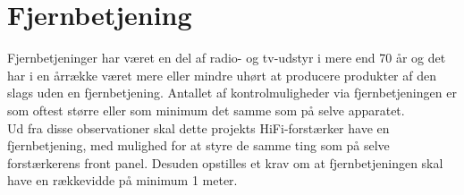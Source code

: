 \section{Fjernbetjening}
\label{fjernbetjening}
Fjernbetjeninger har været en del af radio- og tv-udstyr i mere end 70 år og det har i en årrække været mere eller mindre uhørt at producere produkter af den slags uden en fjernbetjening. Antallet af kontrolmuligheder via fjernbetjeningen er som oftest større eller som minimum det samme som på selve apparatet.\\
Ud fra disse observationer skal dette projekts HiFi-forstærker have en fjernbetjening, med mulighed for at styre de samme ting som på selve forstærkerens front panel. Desuden opstilles et krav om at fjernbetjeningen skal have en rækkevidde på minimum 1 meter. 